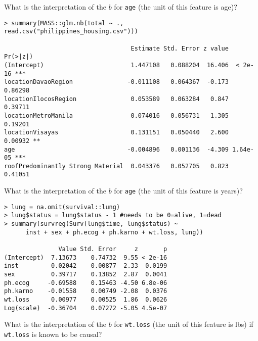 \documentclass[12pt]{article}
\begin{document}
\begin{enumerate}
What is the interpretation of the $b$ for \texttt{age} (the unit of this feature is age)?



\vspace{-0.2cm}
\begin{verbatim}
> summary(MASS::glm.nb(total ~ ., read.csv("philippines_housing.csv")))

                                   Estimate Std. Error z value Pr(>|z|)    
(Intercept)                        1.447108   0.088204  16.406  < 2e-16 ***
locationDavaoRegion               -0.011108   0.064367  -0.173  0.86298    
locationIlocosRegion               0.053589   0.063284   0.847  0.39711    
locationMetroManila                0.074016   0.056731   1.305  0.19201    
locationVisayas                    0.131151   0.050440   2.600  0.00932 ** 
age                               -0.004896   0.001136  -4.309 1.64e-05 ***
roofPredominantly Strong Material  0.043376   0.052705   0.823  0.41051   
\end{verbatim}

What is the interpretation of the $b$ for \texttt{age} (the unit of this feature is years)?



\vspace{-0.2cm}
\begin{verbatim}
> lung = na.omit(survival::lung)
> lung$status = lung$status - 1 #needs to be 0=alive, 1=dead
> summary(survreg(Surv(lung$time, lung$status) ~ 
      inst + sex + ph.ecog + ph.karno + wt.loss, lung))

               Value Std. Error     z       p
(Intercept)  7.13673    0.74732  9.55 < 2e-16
inst         0.02042    0.00877  2.33  0.0199
sex          0.39717    0.13852  2.87  0.0041
ph.ecog     -0.69588    0.15463 -4.50 6.8e-06
ph.karno    -0.01558    0.00749 -2.08  0.0376
wt.loss      0.00977    0.00525  1.86  0.0626
Log(scale)  -0.36704    0.07272 -5.05 4.5e-07
\end{verbatim}

What is the interpretation of the $b$ for \texttt{wt.loss} (the unit of this feature is lbs) if \texttt{wt.loss} is known to be causal?



\end{enumerate}
\end{document}
